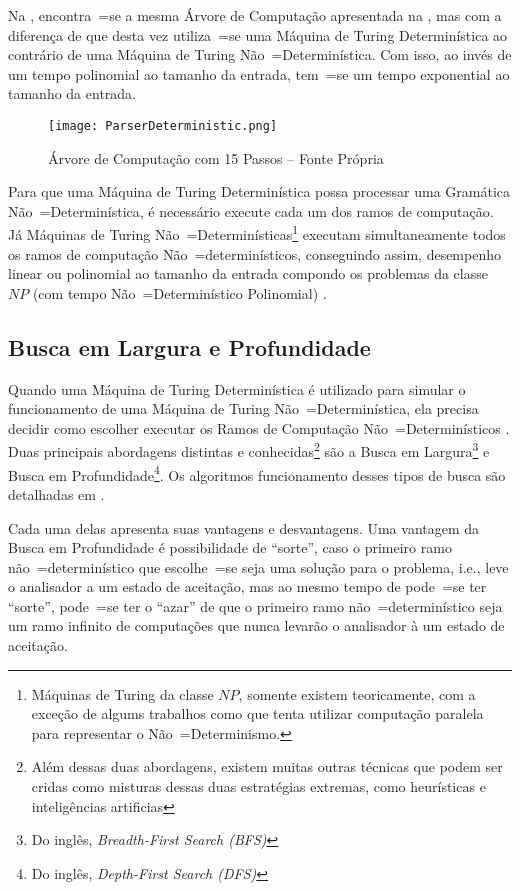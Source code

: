 Na ,
encontra~=se a mesma Árvore de Computação apresentada na ,
mas com a diferença de que desta vez utiliza~=se uma Máquina de Turing Determinística ao contrário de uma Máquina de Turing Não~=Determinística.
Com isso,
ao invés de um tempo polinomial ao tamanho da entrada,
tem~=se um tempo exponential ao tamanho da entrada.
\begin{figure}[h]
\centering
\texttt{[image: ParserDeterministic.png]}
\caption[Árvore de Computação com 15 Passos]{Árvore de Computação com 15 Passos -- Fonte Própria}
\label{ParserDeterministic}
\end{figure}

Para que uma Máquina de Turing Determinística possa processar uma Gramática Não~=Determinística,
é necessário execute cada um dos ramos de computação.
Já Máquinas de Turing Não~=Determinísticas\footnote{
Máquinas de Turing da classe $NP$,
somente existem teoricamente,
com a exceção de algums trabalhos como  que tenta utilizar computação paralela para representar o Não~=Determinismo.
}
executam simultaneamente todos os ramos de computação Não~=determinísticos,
conseguindo assim, desempenho linear ou
polinomial ao tamanho da entrada compondo os problemas da classe $NP$ (com tempo Não~=Determinístico Polinomial) \cite{hopcroftBook}.


\subsection{Busca em Largura e Profundidade}
\label{buscaEmLarguraEProfundidade}

Quando uma Máquina de Turing Determinística é utilizado para simular o funcionamento de uma Máquina de Turing Não~=Determinística,
ela precisa decidir como escolher executar os Ramos de Computação Não~=Determinísticos \cite{sipserBook}.
Duas principais abordagens distintas e
conhecidas\footnote{
Além dessas duas abordagens,
existem muitas outras técnicas que podem ser cridas como misturas dessas duas estratégias extremas,
como heurísticas e inteligências artificias
}
são a Busca em Largura\footnote{
Do inglês, \textit{Breadth-First Search (BFS)}
}
e Busca em Profundidade\footnote{
Do inglês, \textit{Depth-First Search (DFS)}
}.
Os algoritmos funcionamento desses tipos de busca são detalhadas em .

Cada uma delas apresenta suas vantagens e
desvantagens.
Uma vantagem da Busca em Profundidade é possibilidade de ``sorte'',
caso o primeiro ramo não~=determinístico que escolhe~=se seja uma solução para o problema,
i.e.,
leve o analisador a um estado de aceitação,
mas ao mesmo tempo de pode~=se ter ``sorte'',
pode~=se ter o ``azar'' de que o primeiro ramo não~=determinístico seja um ramo infinito de computações que nunca levarão o analisador à um estado de aceitação.

